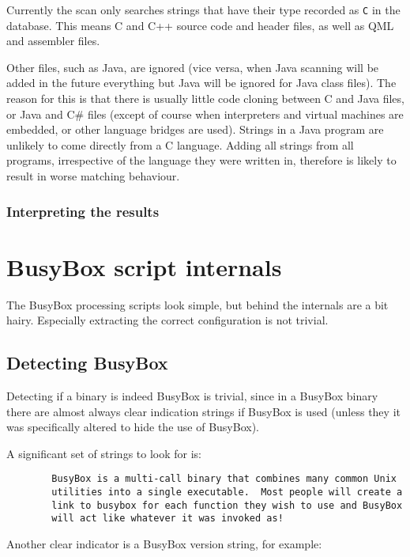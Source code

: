 \documentclass[10pt]{article}
\begin{document}
Currently the scan only searches strings that have their type recorded as
\texttt{C} in the database. This means C and C++ source code and header files,
as well as QML and assembler files.

Other files, such as Java, are ignored (vice versa, when Java scanning will be
added in the future everything but Java will be ignored for Java class files).
The reason for this is that there is usually little code cloning between C and
Java files, or Java and C\# files (except of course when interpreters and virtual
machines are embedded, or other language bridges are used). Strings in a Java
program are unlikely to come directly from a C language. Adding all strings from
all programs, irrespective of the language they were written in, therefore is
likely to result in worse matching behaviour.

\subsubsection{Interpreting the results}

\section{BusyBox script internals}

The BusyBox processing scripts look simple, but behind the internals are a bit
hairy. Especially extracting the correct configuration is not trivial.

\subsection{Detecting BusyBox}

Detecting if a binary is indeed BusyBox is trivial, since in a BusyBox binary
there are almost always clear indication strings if BusyBox is used (unless
they it was specifically altered to hide the use of BusyBox).

A significant set of strings to look for is:

\begin{verbatim}
        BusyBox is a multi-call binary that combines many common Unix
        utilities into a single executable.  Most people will create a
        link to busybox for each function they wish to use and BusyBox
        will act like whatever it was invoked as!
\end{verbatim}

Another clear indicator is a BusyBox version string, for example:
\end{document}
